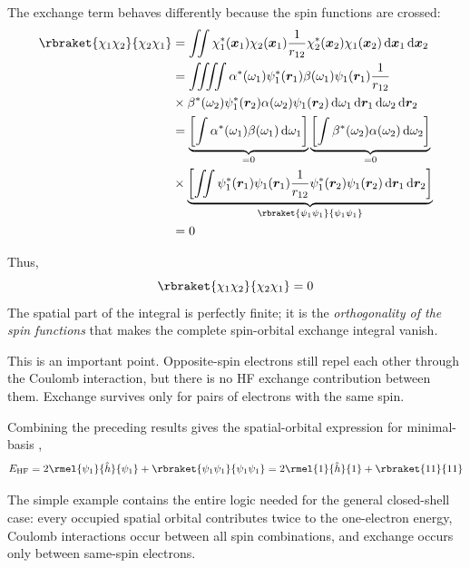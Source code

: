\documentclass[11pt,a4paper,titlepage]{article}
\numberwithin{equation}{section}
\newcommand{\EHF}{E_\text{HF}}
\newcommand{\br}{\boldsymbol{r}}
\newcommand{\bx}{\boldsymbol{x}}
\newcommand{\hh}{\Hat{h}}
\begin{document}
The exchange term behaves differently because the spin functions are crossed:
\begin{equation}
\begin{split}
  \rbraket{\chi_1\chi_2}{\chi_2\chi_1}
  &=
  \iint
  \chi_1^*(\bx_1)
  \chi_2(\bx_1)
  \frac{1}{r_{12}}
  \chi_2^*(\bx_2)
  \chi_1(\bx_2)
  \dd{\bx_1}\dd{\bx_2}
  \\
  &=
  \iiiint
  \alpha^*(\omega_1)
  \psi_1^*(\br_1)
  \beta(\omega_1)
  \psi_1(\br_1)
  \frac{1}{r_{12}}
  \\
  &\times
  \beta^*(\omega_2)
  \psi_1^*(\br_2)
  \alpha(\omega_2)
  \psi_1(\br_2)
  \dd{\omega_1}\dd{\br_1}
  \dd{\omega_2}\dd{\br_2}
  \\
  &=
  \underbrace{
  \qty[
    \int
    \alpha^*(\omega_1)\beta(\omega_1)
    \dd{\omega_1}
  ]}_{=0}
  \underbrace{
  \qty[
    \int
    \beta^*(\omega_2)\alpha(\omega_2)
    \dd{\omega_2}
  ]}_{=0}
  \\
  &\times
  \underbrace{
  \qty[
    \iint
    \psi_1^*(\br_1)\psi_1(\br_1)
    \frac{1}{r_{12}}
    \psi_1^*(\br_2)\psi_1(\br_2)
    \dd{\br_1}\dd{\br_2}
  ]}_{\rbraket{\psi_1\psi_1}{\psi_1\psi_1}}
  \\
  &=0
\end{split}
\end{equation}

Thus,
\begin{equation}
  \rbraket{\chi_1\chi_2}{\chi_2\chi_1}=0
\end{equation}
The spatial part of the integral is perfectly finite; it is the
\emph{orthogonality of the spin functions} that makes the complete
spin-orbital exchange integral vanish.

This is an important point. Opposite-spin electrons still repel each other
through the Coulomb interaction, but there is no HF exchange contribution
between them. Exchange survives only for pairs of electrons with the same
spin.

Combining the preceding results gives the spatial-orbital expression for
minimal-basis ,
\begin{equation}
  \EHF
  =
  2\rmel{\psi_1}{\hh}{\psi_1}
  +
  \rbraket{\psi_1\psi_1}{\psi_1\psi_1}
  =
  2\rmel{1}{\hh}{1}
  +
  \rbraket{11}{11}
  \label{eq:h2-rhf-energy}
\end{equation}

The simple  example contains the entire logic needed for the general
closed-shell case: every occupied spatial orbital contributes twice to the
one-electron energy, Coulomb interactions occur between all spin
combinations, and exchange occurs only between same-spin electrons.
\end{document}
